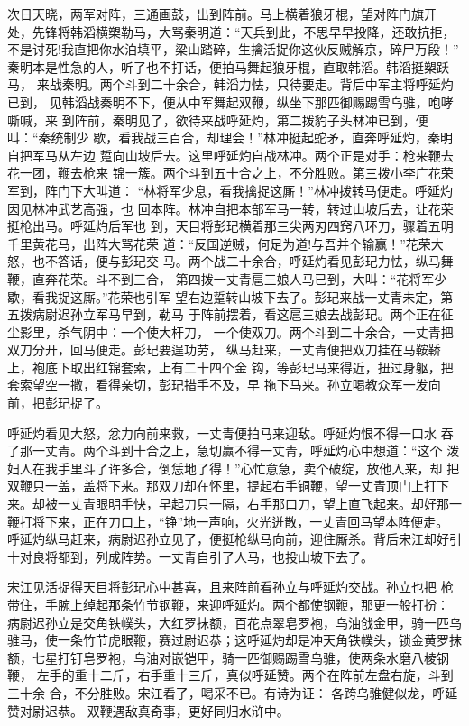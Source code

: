 次日天晓，两军对阵，三通画鼓，出到阵前。马上横着狼牙棍，望对阵门旗开
处，先锋将韩滔横槊勒马，大骂秦明道：“天兵到此，不思早早投降，还敢抗拒，
不是讨死!我直把你水泊填平，梁山踏碎，生擒活捉你这伙反贼解京，碎尸万段！”
秦明本是性急的人，听了也不打话，便拍马舞起狼牙棍，直取韩滔。韩滔挺槊跃马，
来战秦明。两个斗到二十余合，韩滔力怯，只待要走。背后中军主将呼延灼已到，
见韩滔战秦明不下，便从中军舞起双鞭，纵坐下那匹御赐踢雪乌骓，咆哮嘶喊，来
到阵前，秦明见了，欲待来战呼延灼，第二拨豹子头林冲已到，便叫：“秦统制少
歇，看我战三百合，却理会！”林冲挺起蛇矛，直奔呼延灼，秦明自把军马从左边
踅向山坡后去。这里呼延灼自战林冲。两个正是对手：枪来鞭去花一团，鞭去枪来
锦一簇。两个斗到五十合之上，不分胜败。第三拨小李广花荣军到，阵门下大叫道：
“林将军少息，看我擒捉这厮！”林冲拨转马便走。呼延灼因见林冲武艺高强，也
回本阵。林冲自把本部军马一转，转过山坡后去，让花荣挺枪出马。呼延灼后军也
到，天目将彭玘横着那三尖两刃四窍八环刀，骤着五明千里黄花马，出阵大骂花荣
道：“反国逆贼，何足为道!与吾并个输赢！”花荣大怒，也不答话，便与彭玘交
马。两个战二十余合，呼延灼看见彭玘力怯，纵马舞鞭，直奔花荣。斗不到三合，
第四拨一丈青扈三娘人马已到，大叫：“花将军少歇，看我捉这厮。”花荣也引军
望右边踅转山坡下去了。彭玘来战一丈青未定，第五拨病尉迟孙立军马早到，勒马
于阵前摆着，看这扈三娘去战彭玘。两个正在征尘影里，杀气阴中：一个使大杆刀，
一个使双刀。两个斗到二十余合，一丈青把双刀分开，回马便走。彭玘要逞功劳，
纵马赶来，一丈青便把双刀挂在马鞍鞒上，袍底下取出红锦套索，上有二十四个金
钩，等彭玘马来得近，扭过身躯，把套索望空一撒，看得亲切，彭玘措手不及，早
拖下马来。孙立喝教众军一发向前，把彭玘捉了。

呼延灼看见大怒，忿力向前来救，一丈青便拍马来迎敌。呼延灼恨不得一口水
吞了那一丈青。两个斗到十合之上，急切赢不得一丈青，呼延灼心中想道：“这个
泼妇人在我手里斗了许多合，倒恁地了得！”心忙意急，卖个破绽，放他入来，却
把双鞭只一盖，盖将下来。那双刀却在怀里，提起右手铜鞭，望一丈青顶门上打下
来。却被一丈青眼明手快，早起刀只一隔，右手那口刀，望上直飞起来。却好那一
鞭打将下来，正在刀口上，“铮”地一声响，火光迸散，一丈青回马望本阵便走。
呼延灼纵马赶来，病尉迟孙立见了，便挺枪纵马向前，迎住厮杀。背后宋江却好引
十对良将都到，列成阵势。一丈青自引了人马，也投山坡下去了。

宋江见活捉得天目将彭玘心中甚喜，且来阵前看孙立与呼延灼交战。孙立也把
枪带住，手腕上绰起那条竹节钢鞭，来迎呼延灼。两个都使钢鞭，那更一般打扮：
病尉迟孙立是交角铁幞头，大红罗抹额，百花点翠皂罗袍，乌油戗金甲，骑一匹乌
骓马，使一条竹节虎眼鞭，赛过尉迟恭；这呼延灼却是冲天角铁幞头，锁金黄罗抹
额，七星打钉皂罗袍，乌油对嵌铠甲，骑一匹御赐踢雪乌骓，使两条水磨八棱钢鞭，
左手的重十二斤，右手重十三斤，真似呼延赞。两个在阵前左盘右旋，斗到三十余
合，不分胜败。宋江看了，喝采不已。有诗为证：
各跨乌骓健似龙，呼延赞对尉迟恭。
双鞭遇敌真奇事，更好同归水浒中。


